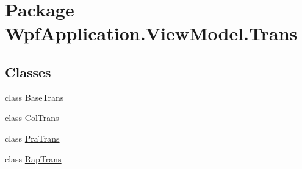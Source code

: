 \hypertarget{namespace_wpf_application_1_1_view_model_1_1_trans}{\section{Package Wpf\-Application.\-View\-Model.\-Trans}
\label{namespace_wpf_application_1_1_view_model_1_1_trans}
}
\subsection*{Classes}
\begin{DoxyCompactItemize}
\item 
class \hyperlink{class_wpf_application_1_1_view_model_1_1_trans_1_1_base_trans}{Base\-Trans}
\item 
class \hyperlink{class_wpf_application_1_1_view_model_1_1_trans_1_1_col_trans}{Col\-Trans}
\item 
class \hyperlink{class_wpf_application_1_1_view_model_1_1_trans_1_1_pra_trans}{Pra\-Trans}
\item 
class \hyperlink{class_wpf_application_1_1_view_model_1_1_trans_1_1_rap_trans}{Rap\-Trans}
\end{DoxyCompactItemize}
